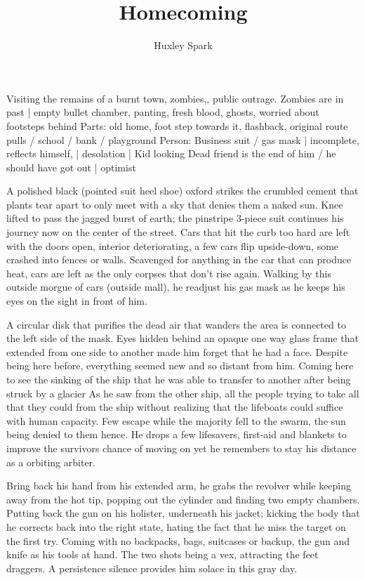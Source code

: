 \title{Homecoming}
\author{Huxley Spark}
\begin{Outline}
        Visiting the remains of a burnt town, zombies,, public outrage. Zombies are in past | empty bullet chamber, panting, fresh blood, ghosts, worried about
    footsteps behind
    Parts: old home, foot step towards it, flashback, original route pulls / school / bank / playground
    Person: Business suit / gas mask | incomplete, reflects himself, | desolation | Kid looking
    Dead friend is the end of him / he should have got out | optimist
\end{Outline}
\begin{Document}
        A polished black (pointed suit heel shoe) oxford strikes the crumbled cement that plants tear apart to only meet with a sky that denies them a naked
    sun. Knee lifted to pass the jagged burst of earth; the pinstripe 3-piece suit continues his journey now on the center of the street. Cars that hit the
    curb too hard are left with the doors open, interior deteriorating, a few cars flip upside-down, some crashed into fences or walls. Scavenged for anything
    in the car that can produce heat, cars are left as the only corpses that don't rise again. Walking by this outside morgue of cars  (outside mall), he
    readjust his gas mask as he keeps his eyes on the sight in front of him.

        A circular disk that purifies the dead air that wanders the area is connected to the left side of the mask. Eyes hidden behind an opaque one way glass
    frame that extended from one side to another made him forget that he had a face. Despite being here before, everything seemed new and so distant from him.
    Coming here to see the sinking of the ship that he was able to transfer to another after being struck by a glacier  As he saw from the other ship, all the
    people trying to take all that they could from the ship without realizing that the lifeboats could suffice with human capacity. Few escape while the majority
    fell to the swarm, the sun being denied to them hence. He drops a few lifesavers, first-aid and blankets to improve the survivors chance of moving on yet
    he remembers to stay his distance as a orbiting arbiter.

        Bring back his hand from his extended arm, he grabs the revolver while keeping away from the hot tip, popping out the cylinder and finding two empty
    chambers. Putting back the gun on his holister, underneath his jacket; kicking the body that he corrects back into the right state, hating the fact that he
    miss the target on the first try. Coming with no backpacks, bags, suitcases or backup, the gun and knife as his tools at hand. The two shots being a vex,
    attracting the feet draggers. A persistence silence provides him solace in this gray day.


\end{Document}
